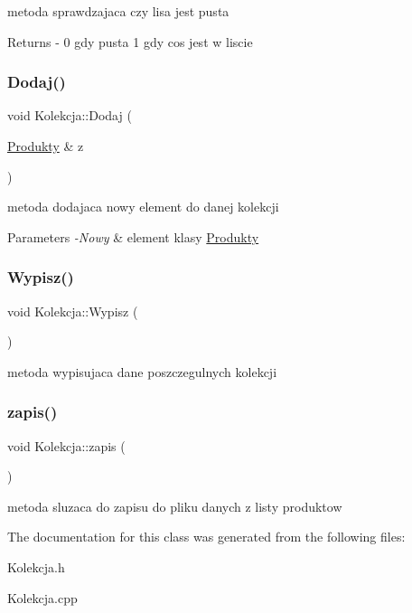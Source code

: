 metoda sprawdzajaca czy lisa jest pusta \begin{DoxyReturn}{Returns}
-\/ 0 gdy pusta 1 gdy cos jest w liscie 
\end{DoxyReturn}
\mbox{\label{class_kolekcja_a8631b63e89e8b0b4761aa888297e9f4a}} 
\subsubsection{\texorpdfstring{Dodaj()}{Dodaj()}}
{\footnotesize\ttfamily void Kolekcja\+::\+Dodaj (\begin{DoxyParamCaption}\item[{\mbox{\hyperlink{class_produkty}{Produkty}} \&}]{z }\end{DoxyParamCaption})}

metoda dodajaca nowy element do danej kolekcji 
\begin{DoxyParams}{Parameters}
{\em -\/\+Nowy} & element klasy \mbox{\hyperlink{class_produkty}{Produkty}} \\
\hline
\end{DoxyParams}
\mbox{\label{class_kolekcja_af76172e2b430490eaea2b2f553a598a6}} 
\subsubsection{\texorpdfstring{Wypisz()}{Wypisz()}}
{\footnotesize\ttfamily void Kolekcja\+::\+Wypisz (\begin{DoxyParamCaption}{ }\end{DoxyParamCaption})}

metoda wypisujaca dane poszczegulnych kolekcji \mbox{\label{class_kolekcja_adb7f74fefe7f8713fbececd03a3740d0}} 
\subsubsection{\texorpdfstring{zapis()}{zapis()}}
{\footnotesize\ttfamily void Kolekcja\+::zapis (\begin{DoxyParamCaption}{ }\end{DoxyParamCaption})}

metoda sluzaca do zapisu do pliku danych z listy produktow 

The documentation for this class was generated from the following files\+:\begin{DoxyCompactItemize}
\item 
Kolekcja.\+h\item 
Kolekcja.\+cpp\end{DoxyCompactItemize}
